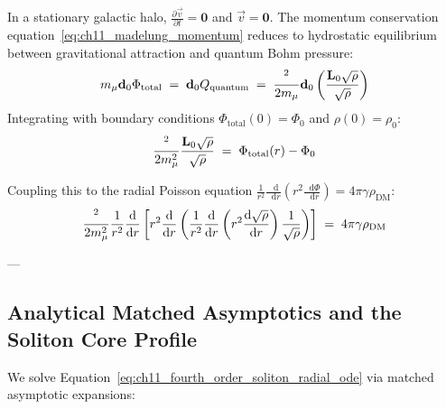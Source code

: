 \documentclass[
    12pt,
    a4paper,
    headings=normal,
    twoside=false,
    open=any,
    parskip=half
]{scrbook}
\let\hbar\relax
\newcommand{\diff}{\mathop{}\!\mathrm{d}}
\begin{document}
In a stationary galactic halo, $\frac{\partial\vec{v}}{\partial t} = \mathbf{0}$ and $\vec{v} = \mathbf{0}$. The momentum conservation equation~\eqref{eq:ch11_madelung_momentum} reduces to hydrostatic equilibrium between gravitational attraction and quantum Bohm pressure:
\begin{equation}
m_\mu \mathbf{d}_0 \Phi_{\text{total}} \;=\; \mathbf{d}_0 Q_{\text{quantum}} \;=\; \frac{\hbar^2}{2m_\mu} \mathbf{d}_0 \left( \frac{\mathbf{L}_0 \sqrt{\rho}}{\sqrt{\rho}} \right)
\label{eq:ch11_hydrostatic_equilibrium_ode}
\end{equation}
Integrating with boundary conditions $\Phi_{\text{total}}(0) = \Phi_0$ and $\rho(0) = \rho_0$:
\begin{equation}
\frac{\hbar^2}{2m_\mu^2} \frac{\mathbf{L}_0 \sqrt{\rho}}{\sqrt{\rho}} \;=\; \Phi_{\text{total}}(r) - \Phi_0
\end{equation}

Coupling this to the radial Poisson equation $\frac{1}{r^2}\frac{\diff}{\diff r}(r^2 \frac{\diff\Phi}{\diff r}) = 4\pi\gamma \rho_{\text{DM}}$:
\begin{equation}
\frac{\hbar^2}{2m_\mu^2} \frac{1}{r^2}\frac{\diff}{\diff r}\left[ r^2 \frac{\diff}{\diff r}\left( \frac{1}{r^2}\frac{\diff}{\diff r}\left( r^2 \frac{\diff \sqrt{\rho}}{\diff r} \right) \frac{1}{\sqrt{\rho}} \right) \right] \;=\; 4\pi\gamma \rho_{\text{DM}}
\label{eq:ch11_fourth_order_soliton_radial_ode}
\end{equation}

---

\subsection{Analytical Matched Asymptotics and the Soliton Core Profile}

We solve Equation~\eqref{eq:ch11_fourth_order_soliton_radial_ode} via matched asymptotic expansions:
\end{document}
